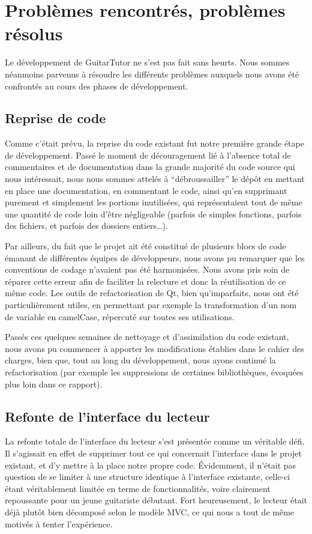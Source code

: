\section{Problèmes rencontrés, problèmes résolus}

Le développement de GuitarTutor ne s'est pas fait sans heurts. Nous sommes néanmoins parvenus à résoudre les différents problèmes auxquels nous avons été confrontés au cours des phases de développement.

\subsection{Reprise de code}

Comme c'était prévu, la reprise du code existant fut notre première grande étape de développement. Passé le moment de découragement lié à l'absence total de commentaires et de documentation dans la grande majorité du code source qui nous intéressait, nous nous sommes attelés à ``débroussailler'' le dépôt en mettant en place une documentation, en commentant le code, ainsi qu'en supprimant purement et simplement les portions inutilisées, qui représentaient tout de même une quantité de code loin d'être négligeable (parfois de simples fonctions, parfois des fichiers, et parfois des dossiers entiers\dots).

Par ailleurs, du fait que le projet ait été constitué de plusieurs blocs de code émanant de différentes équipes de développeurs, nous avons pu remarquer que les conventions de codage n'avaient pas été harmonisées. Nous avons pris soin de réparer cette erreur afin de faciliter la relecture et donc la réutilisation de ce même code. Les outils de refactorisation de Qt, bien qu'imparfaits, nous ont été particulièrement
utiles, en permettant par exemple la transformation d'un nom de variable en camelCase, répercuté sur toutes ses utilisations.

Passés ces quelques semaines de nettoyage et d'assimilation du code existant, nous avons pu commencer à apporter les modifications établies dans le cahier des charges, bien que, tout au long du développement, nous ayons continué la refactorisation (par exemple les suppressions de certaines bibliothèques, évoquées plus loin dans ce rapport).

\subsection{Refonte de l'interface du lecteur}

La refonte totale de l'interface du lecteur s'est présentée comme un véritable défi. Il s'agissait en effet de supprimer tout ce qui concernait l'interface dans le projet existant, et d'y mettre à la place notre propre code. Évidemment, il n'était pas question de se limiter à une structure identique à l'interface existante, celle-ci étant véritablement limitée en terme de fonctionnalités, voire clairement repoussante pour un jeune guitariste débutant. Fort heureusement, le lecteur était déjà plut\^ot bien décomposé selon le modèle \ac{MVC}, ce qui nous a tout de m\^eme motivés à tenter l'expérience.

